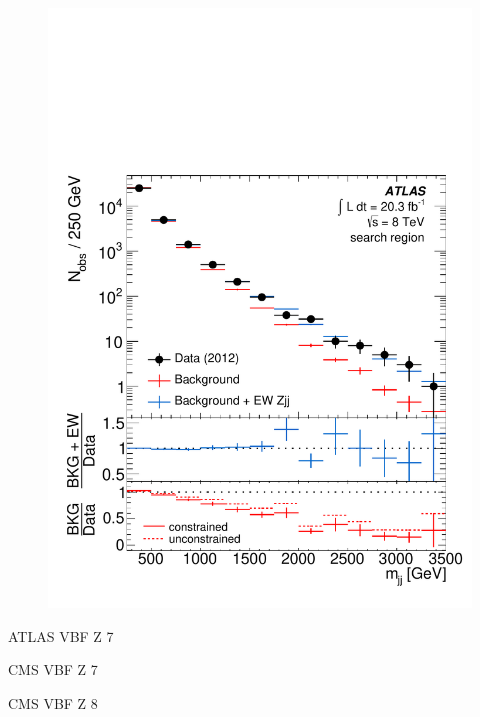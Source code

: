 \begin{figure}[p]
    \centering
    \includegraphics[height=0.3\textheight]{figures/ss-exclboson-z2j-atlas8tev}
    \caption{}
    \label{fig:ss-exclboson-z2j-atlas8tev}
\end{figure}
ATLAS VBF Z 7 \TeV~\cite{Aad:2014dta}

CMS VBF Z 7 \TeV~\cite{Chatrchyan:2013jya}

CMS VBF Z 8 \TeV~\cite{Khachatryan:2014dea}
